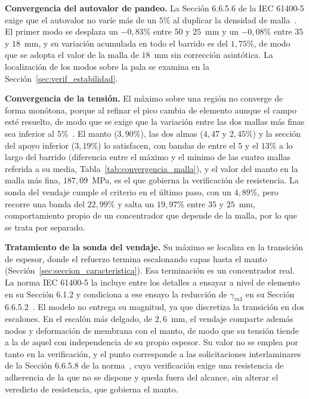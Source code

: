 \medskip
\noindent\textbf{Convergencia del autovalor de pandeo.}
La Sección 6.6.5.6 de la IEC 61400-5 exige que el autovalor no varíe más de un $5\%$ al duplicar la densidad de malla~\parencite*{IEC61400-5}. El primer modo se desplaza un $-0{,}83\%$ entre $50$ y $25$~mm y un $-0{,}08\%$ entre $35$ y $18$~mm, y su variación acumulada en todo el barrido es del $1{,}75\%$, de modo que se adopta el valor de la malla de $18$~mm sin corrección asintótica. La localización de los modos sobre la pala se examina en la Sección~\ref{sec:verif_estabilidad}.

\medskip
\noindent\textbf{Convergencia de la tensión.}
El máximo sobre una región no converge de forma monótona, porque al refinar el pico cambia de elemento aunque el campo esté resuelto, de modo que se exige que la variación entre las dos mallas más finas sea inferior al $5\%$~\parencite{Qin2026,Hameed2015,Boudounit2020}. El manto ($3{,}90\%$), las dos almas ($4{,}47$ y $2{,}45\%$) y la sección del apoyo inferior ($3{,}19\%$) lo satisfacen, con bandas de entre el $5$ y el $13\%$ a lo largo del barrido (diferencia entre el máximo y el mínimo de las cuatro mallas referida a su media, Tabla~\ref{tab:convergencia_malla}), y el valor del manto en la malla más fina, $187{,}09$~MPa, es el que gobierna la verificación de resistencia. La sonda del vendaje cumple el criterio en el último paso, con un $4{,}89\%$, pero recorre una banda del $22{,}99\%$ y salta un $19{,}97\%$ entre $35$ y $25$~mm, comportamiento propio de un concentrador que depende de la malla, por lo que se trata por separado.

\medskip
\noindent\textbf{Tratamiento de la sonda del vendaje.}
Su máximo se localiza en la transición de espesor, donde el refuerzo termina escalonando capas hasta el manto (Sección~\ref{sec:seccion_caracteristica}). Esa terminación es un concentrador real. La norma IEC 61400-5 la incluye entre los detalles a ensayar a nivel de elemento en su Sección 6.1.2 y condiciona a ese ensayo la reducción de $\gamma_{m3}$ en su Sección 6.6.5.2~\parencite*{IEC61400-5}. El modelo no entrega su magnitud, ya que discretiza la transición en dos escalones. En el escalón más delgado, de $2{,}6$~mm, el vendaje comparte además nodos y deformación de membrana con el manto, de modo que su tensión tiende a la de aquel con independencia de su propio espesor. Su valor no se emplea por tanto en la verificación, y el punto corresponde a las solicitaciones interlaminares de la Sección 6.6.5.8 de la norma~\parencite{IEC61400-5}, cuya verificación exige una resistencia de adherencia de la que no se dispone y queda fuera del alcance, sin alterar el veredicto de resistencia, que gobierna el manto.

